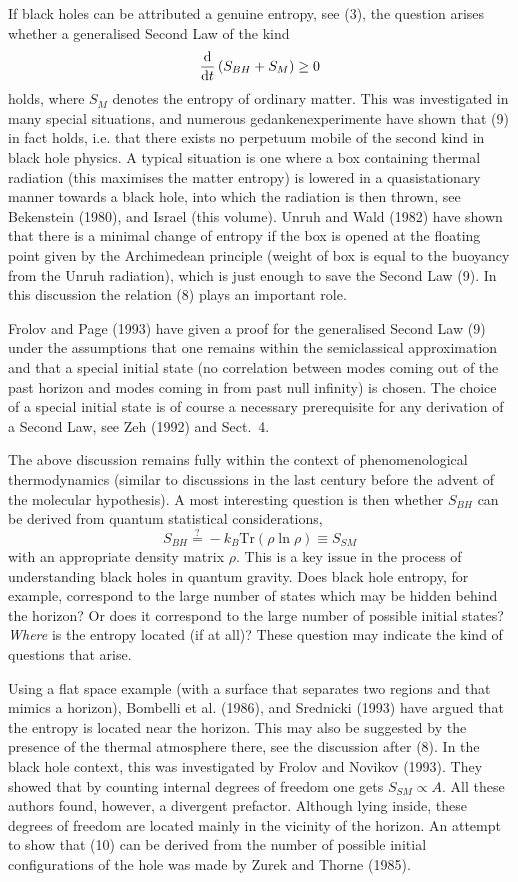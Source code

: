 \documentclass[12pt]{article}
\def\D{{\rm d}}
\newcommand{\be}{\begin{equation}}
\newcommand{\ee}{\end{equation}}
\begin{document}
If black holes can be attributed a genuine entropy, see (3),
the question arises whether a generalised Second Law of the kind
\be \frac{\D}{\D t}\left(S_{BH}+S_M\right)\geq 0  \ee
holds, where $S_M$ denotes the entropy of ordinary matter. 
This was investigated in many special situations, and numerous
gedankenexperimente have shown that (9) in fact holds, i.e. that there exists
no perpetuum mobile of the second kind in black hole physics. 
A typical situation is one where a box containing thermal radiation
(this maximises the matter entropy) is lowered in a quasistationary
manner towards a black hole, into which the radiation is then thrown,
see Bekenstein (1980), and Israel (this volume).
 Unruh and Wald (1982) have shown that
there is a minimal change of entropy if the box is opened at the
floating point given by the Archimedean principle (weight of box
is equal to the buoyancy from the Unruh radiation), which is just enough
to save the Second Law (9). In this discussion the relation
(8) plays an important role.

Frolov and Page (1993) have given a proof for the generalised
Second Law (9) under the assumptions that one remains within
the semiclassical approximation and that a special initial state
(no correlation between modes coming out of the past horizon
and modes coming in from past null infinity) is chosen. 
The choice of a special initial state is of course a necessary
prerequisite for any derivation of a Second Law, see Zeh (1992)
and Sect.~4.

The above discussion remains fully within the context of 
phenomenological thermodynamics (similar to discussions in the
last century before the advent of the molecular hypothesis).
A most interesting question is then whether $S_{BH}$ can be derived from 
quantum statistical considerations,
\be S_{BH}\stackrel{?}{=}-k_B\mbox{Tr}(\rho\ln\rho)
                       \equiv S_{SM} \ee
with an appropriate density matrix $\rho$. This is a key issue in
the process of understanding black holes in quantum gravity.
Does black hole entropy, for example, correspond to the large
number of states which may be hidden behind the horizon?
Or does it correspond to the large number of possible initial
states? {\em Where} is the entropy located (if at all)?
These question may indicate the kind of questions that arise.

Using a flat space example (with a surface that separates two regions
and that mimics a horizon),
Bombelli et al. (1986), and Srednicki (1993) have argued that
the entropy is located near the horizon. This may also be suggested
by the presence of the thermal atmosphere there, see the discussion
after (8). In the black hole context, this was investigated by
Frolov and Novikov (1993). They showed that by counting internal
degrees of freedom one gets $S_{SM}\propto A$.
All these authors found, however, a divergent
prefactor. Although lying inside, these degrees of freedom
are located mainly in the vicinity of the horizon.
An attempt to show that (10) can be derived from the number of possible
initial configurations of the hole was made by Zurek and Thorne (1985).
\end{document}

